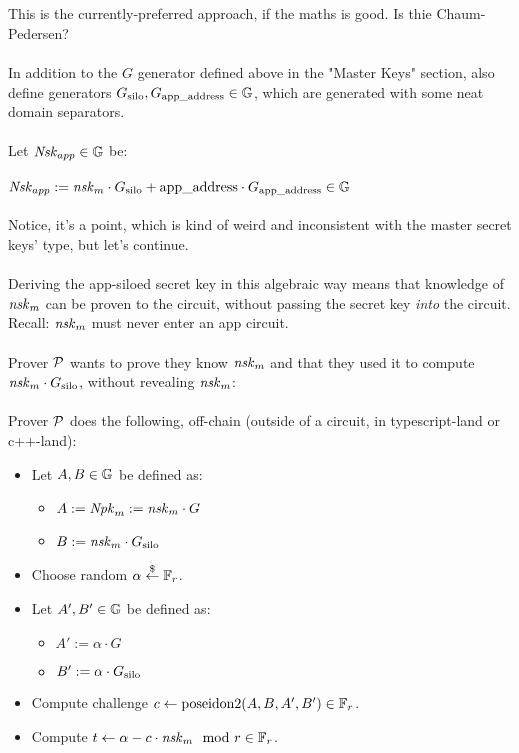 \hfill\\
\\
This is the currently-preferred approach, if the maths is good. Is thie Chaum-Pedersen?\\
\\
In addition to the $G$ generator defined above in the "Master Keys" section, also define generators $\Gsilo, \Gappaddress \in \G$, which are generated with some neat domain separators.\\
\\
Let $\Nskapp \in \G$ be:\\
\\
$\Nskapp := \nskm \cdot \Gsilo + \appaddress \cdot \Gappaddress \in \G$\\
\\
Notice, it's a point, which is kind of weird and inconsistent with the master secret keys' type, but let's continue.\\
\\
Deriving the app-siloed secret key in this algebraic way means that knowledge of $\nskm$ can be proven to the circuit, without passing the secret key \textit{into} the circuit.
Recall: $\nskm$ must never enter an app circuit.\\
\\
Prover $\P$ wants to prove they know $\nskm$ and that they used it to compute $\nskm \cdot \Gsilo$, without revealing $\nskm$:\\
\\
Prover $\P$ does the following, off-chain (outside of a circuit, in typescript-land or c++-land):

\begin{itemize}
    \item Let $A, B \in \G$ be defined as:
    \begin{itemize}
        \item $A := \Npkm := \nskm \cdot G$
        \item $B := \nskm \cdot \Gsilo$
    \end{itemize}
    \item Choose random $\alpha \stackrel{\$}{\leftarrow} \Fr$.
    \item Let $A', B' \in \G$ be defined as:
    \begin{itemize}
        \item $A' := \alpha \cdot G$
        \item $B' := \alpha \cdot \Gsilo$
    \end{itemize}
    \item Compute challenge $c \leftarrow \poseidon(A, B, A', B') \in \Fr$.
    \item Compute $t \leftarrow \alpha - c \cdot \nskm \mod r \in \Fr$.
\end{itemize}

